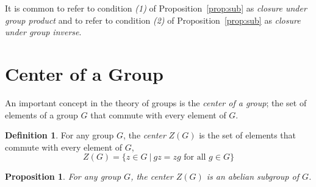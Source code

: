 \documentclass[12pt]{amsart}
\newtheorem{proposition}[theorem]{Proposition}
\theoremstyle{definition}
\newtheorem{definition}[theorem]{Definition}
\theoremstyle{plain}
\begin{document}
It is common to refer to condition \emph{(1)} of Proposition~\ref{prop:sub} as \emph{closure under group product} and to refer to condition \emph{(2)} of Proposition~\ref{prop:sub} as \emph{closure under group inverse}.






\section{Center of a Group}

An important concept in the theory of groups is the \emph{center of a group}; the set of elements of a group $G$ that commute with every element of $G$.

\begin{definition}
    For any group $G$, the \emph{center} $Z(G)$ is the set of elements that commute with every element of $G$,
    \[
        Z(G) = \{ z \in G~|~gz = zg \text{ for all } g \in G \}
    \]
\end{definition}

\begin{proposition}
    For any group $G$, the center $Z(G)$ is an abelian subgroup of $G$.
\end{proposition}
\end{document}
